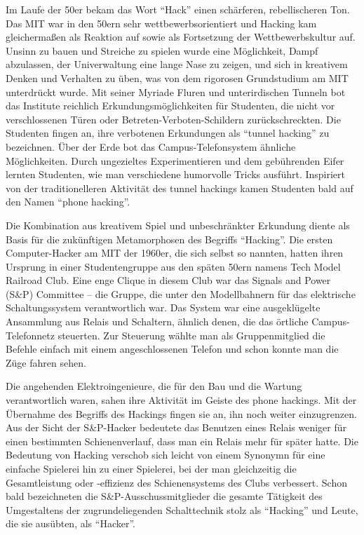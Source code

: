 Im Laufe der 50er bekam das Wort "`Hack"' einen schärferen, rebellischeren Ton. Das MIT war in den 50ern sehr wettbewerbsorientiert und Hacking kam gleichermaßen als Reaktion auf sowie als Fortsetzung der Wettbewerbskultur auf. Unsinn zu bauen und Streiche zu spielen wurde eine Möglichkeit, Dampf abzulassen, der Univerwaltung eine lange Nase zu zeigen, und sich in kreativem Denken und Verhalten zu üben, was von dem rigorosen Grundstudium am MIT unterdrückt wurde. Mit seiner Myriade Fluren und unterirdischen Tunneln bot das Institute reichlich Erkundungsmöglichkeiten für Studenten, die nicht vor verschlossenen Türen oder Betreten-Verboten-Schildern zurückschreckten. Die Studenten fingen an, ihre verbotenen Erkundungen als "`tunnel hacking"' zu bezeichnen. Über der Erde bot das Campus-Telefonsystem ähnliche Möglichkeiten. Durch ungezieltes Experimentieren und dem gebührenden Eifer lernten Studenten, wie man verschiedene humorvolle Tricks ausführt. Inspiriert von der traditionelleren Aktivität des tunnel hackings kamen Studenten bald auf den Namen "`phone hacking"'.

Die Kombination aus kreativem Spiel und unbeschränkter Erkundung diente als Basis für die zukünftigen Metamorphosen des Begriffs "`Hacking"'. Die ersten Computer-Hacker am MIT der 1960er, die sich selbst so nannten, hatten ihren Ursprung in einer Studentengruppe aus den späten 50ern namens Tech Model Railroad Club. Eine enge Clique in diesem Club war das Signals and Power (S\&P) Committee – die Gruppe, die unter den Modellbahnern für das elektrische Schaltungssystem verantwortlich war. Das System war eine ausgeklügelte Ansammlung aus Relais und Schaltern, ähnlich denen, die das örtliche Campus-Telefonnetz steuerten. Zur Steuerung wählte man als Gruppenmitglied die Befehle einfach mit einem angeschlossenen Telefon und schon konnte man die Züge fahren sehen.

Die angehenden Elektroingenieure, die für den Bau und die Wartung verantwortlich waren, sahen ihre Aktivität im Geiste des phone hackings. Mit der Übernahme des Begriffs des Hackings fingen sie an, ihn noch weiter einzugrenzen. Aus der Sicht der S\&P-Hacker bedeutete das Benutzen eines Relais weniger für einen bestimmten Schienenverlauf, dass man ein Relais mehr für später hatte. Die Bedeutung von Hacking verschob sich leicht von einem Synonymn für eine einfache Spielerei hin zu einer Spielerei, bei der man gleichzeitig die Gesamtleistung oder -effizienz des Schienensystems des Clubs verbessert. Schon bald bezeichneten die S\&P-Ausschussmitglieder die gesamte Tätigkeit des Umgestaltens der zugrundeliegenden Schalttechnik stolz als "`Hacking"' und Leute, die sie ausübten, als "`Hacker"'.

